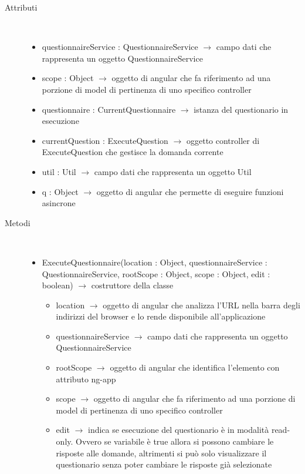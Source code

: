 \begin{description}
\item[Attributi] \hfill \\
\vspace{-7mm}
\begin{itemize}
	\item questionnaireService : QuestionnaireService $\rightarrow$ campo dati che rappresenta un oggetto QuestionnaireService
	\item scope : Object $\rightarrow$ oggetto di angular che fa riferimento ad una porzione di model di pertinenza di uno specifico controller
	\item questionnaire : CurrentQuestionnaire $\rightarrow$ istanza del questionario in esecuzione
	\item currentQuestion : ExecuteQuestion $\rightarrow$ oggetto controller di ExecuteQuestion che gestisce la domanda corrente
	\item util : Util $\rightarrow$ campo dati che rappresenta un oggetto Util
	\item q : Object $\rightarrow$ oggetto di angular che permette di eseguire funzioni asincrone
\end{itemize}

\item[Metodi] \hfill \\
\vspace{-7mm}
\begin{itemize}
	\item ExecuteQuestionnaire(location : Object, questionnaireService : QuestionnaireService, rootScope : Object, scope : Object, edit : boolean) $\rightarrow$ costruttore della classe\begin{itemize}
		\item location $\rightarrow$ oggetto di angular che analizza l'URL nella barra degli indirizzi del browser e lo rende disponibile all'applicazione
		\item questionnaireService $\rightarrow$ campo dati che rappresenta un oggetto QuestionnaireService
		\item rootScope $\rightarrow$ oggetto di angular che identifica l’elemento con attributo ng-app
		\item scope $\rightarrow$ oggetto di angular che fa riferimento ad una porzione di model di pertinenza di uno specifico controller
		\item edit $\rightarrow$ indica se esecuzione del questionario è in modalità read-only. Ovvero se variabile è true allora si possono cambiare le risposte alle domande, altrimenti si può solo visualizzare il questionario senza poter cambiare le risposte già selezionate 
	\end{itemize}
	

\end{itemize}
\end{description}

